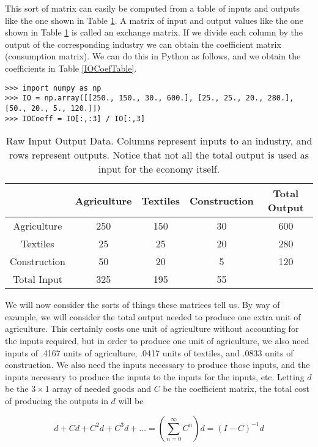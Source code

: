 This sort of matrix can easily be computed from a table of inputs and outputs like the one shown in Table \ref{IORawTable}.
A matrix of input and output values like the one shown in Table \ref{IORawTable} is called an exchange matrix.
If we divide each column by the output of the corresponding industry we can obtain the coefficient matrix (consumption matrix).
We can do this in Python as follows, and we obtain the coefficients in Table \ref{IOCoefTable}.

\begin{lstlisting}
>>> import numpy as np
>>> IO = np.array([[250., 150., 30., 600.], [25., 25., 20., 280.], [50., 20., 5., 120.]])
>>> IOCoeff = IO[:,:3] / IO[:,3]
\end{lstlisting}

\begin{table}
\begin{center}
\begin{tabular}{|c|c|c|c|c|}
\hline
& Agriculture & Textiles & Construction & Total Output \\ \hline
Agriculture & 250 & 150 & 30 & 600 \\ \hline
Textiles & 25 & 25 & 20 & 280 \\ \hline
Construction & 50 & 20 & 5 & 120 \\ \hline
Total Input & 325 & 195 & 55 & \\ \hline
\end{tabular}
\caption{Raw Input Output Data.
Columns represent inputs to an industry, and rows represent outputs.
Notice that not all the total output is used as input for the economy itself.}
\label{IORawTable}
\end{center}
\end{table}

We will now consider the sorts of things these matrices tell us.
By way of example, we will consider the total output needed to produce one extra unit of agriculture.
This certainly costs one unit of agriculture without accounting for the inputs required, but in order to produce one unit of agriculture, we also need inputs of .4167 units of agriculture, .0417 units of textiles, and .0833 units of construction.
We also need the inputs necessary to produce those inputs, and the inputs necessary to produce the inputs to the inputs for the inputs, etc.
Letting $d$ be the $3\times 1$ array of needed goods and $C$ be the coefficient matrix, the total cost of producing the outputs in $d$ will be

\[ d + C d + C^2 d + C^3 d + \dots = \left( \sum_{n=0}^{\infty} C^n \right) d = \left( I - C \right)^{-1} d\]

